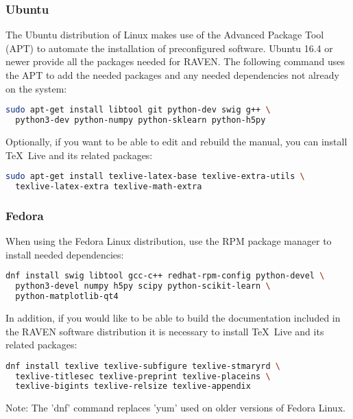 \subsubsection{Ubuntu}

The Ubuntu distribution of Linux makes use of the Advanced Package
Tool (APT) to automate the installation of preconfigured software.
Ubuntu 16.4 or newer provide all the packages needed for RAVEN.  The
following command uses the APT to add the needed packages and any
needed dependencies not already on the system:

\begin{lstlisting}[language=bash]
sudo apt-get install libtool git python-dev swig g++ \
  python3-dev python-numpy python-sklearn python-h5py
\end{lstlisting}

Optionally, if you want to be able to edit and rebuild the manual, you can
install \TeX~Live and its related packages:
\begin{lstlisting}[language=bash]
sudo apt-get install texlive-latex-base texlive-extra-utils \
  texlive-latex-extra texlive-math-extra
\end{lstlisting}

\goToRavenInstallation

\subsubsection{Fedora}

When using the Fedora Linux distribution, use the RPM package manager to
install needed dependencies:

\begin{lstlisting}[language=bash]
dnf install swig libtool gcc-c++ redhat-rpm-config python-devel \
  python3-devel numpy h5py scipy python-scikit-learn \
  python-matplotlib-qt4
\end{lstlisting}

In addition, if you would like to be able to build the documentation
included in the RAVEN software distribution it is necessary to install
\TeX~Live and its related packages:
\begin{lstlisting}[language=bash]
dnf install texlive texlive-subfigure texlive-stmaryrd \
  texlive-titlesec texlive-preprint texlive-placeins \
  texlive-bigints texlive-relsize texlive-appendix
\end{lstlisting}

Note: The 'dnf' command replaces 'yum' used on older versions of
Fedora Linux.

